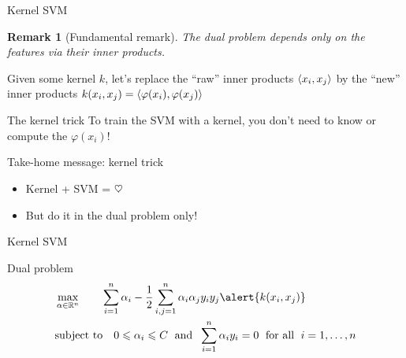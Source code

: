 \documentclass[xcolor={usenames,dvipsnames}]{beamer}
\newtheorem{remark}[theorem]{Remark}
\begin{document}
\begin{frame}{Kernel SVM }


  \begin{remark}[Fundamental remark] 
  The dual problem depends only on the features via their inner products.
  \end{remark}
  \pause 

  \bigskip
  Given some kernel $k$, let's replace the ``raw'' inner products $\langle x_i, x_j \rangle$ by the ``new'' inner products $k(x_i, x_j) = \langle \varphi(x_i), \varphi(x_j) \rangle$
  
  \pause 

  \bigskip
  \begin{block}{The kernel trick}
  To train the SVM with a kernel, you don't need to know or compute the $\varphi(x_i)$! 
  \end{block}

\pause
\begin{alertblock}{Take-home message: kernel trick}
\begin{itemize}
\item Kernel + SVM = $\heartsuit$
\item But do it in the dual problem only!
\end{itemize}
\end{alertblock}  
  
\end{frame}  


\begin{frame}{Kernel SVM}

\begin{block}{Dual problem}
  \begin{align*}
      &\max_{\alpha \in \R^n} \quad \quad \sum_{i=1}^n \alpha_i - \frac 12 \sum_{i, j=1}^n \alpha_i \alpha_j y_i y_j \alert{k(x_i, x_j)} \\
    &\text{subject to} \quad 0 \leq \alpha_i \leq C \; \text{ and } \; 
    \sum_{i=1}^n \alpha_i y_i  = 0 \; \text{ for all } \; i=1, \ldots, n
  \end{align*}
 \end{block}
 
 \end{frame}
 
\end{document}
